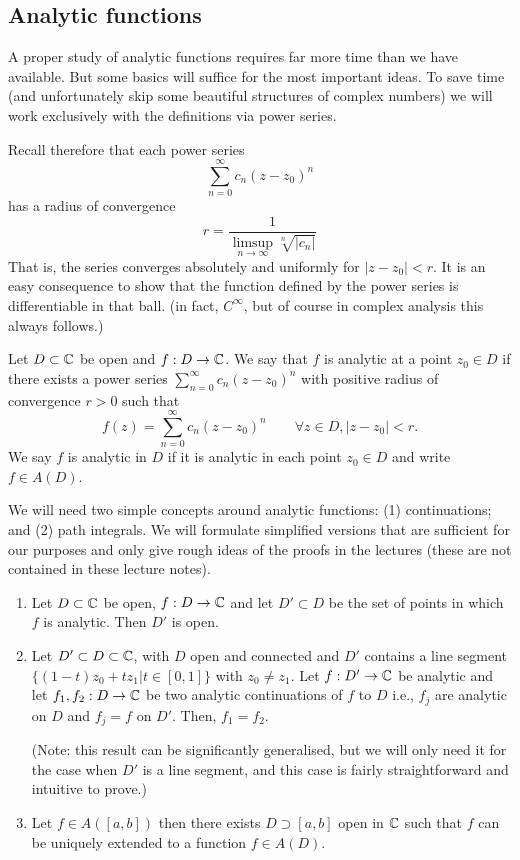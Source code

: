 

\subsection{Analytic functions}
%
A proper study of analytic functions requires far more time than we have
available. But some basics will suffice for the most important ideas.
To save time (and unfortunately skip some beautiful structures of
complex numbers) we will work exclusively with the definitions via power
series.

Recall therefore that each power series
\[
    \sum_{n = 0}^\infty c_n (z - z_0)^n
\]
has a radius of convergence
\[
    r = \frac{1}{\limsup_{n \to \infty} \sqrt[n]{|c_n|}}
\]
That is, the series converges absolutely and uniformly for $|z - z_0| < r$. It is an easy consequence to show that the function defined by the power series is differentiable in that ball. (in fact, $C^\infty$, but of course in complex analysis this always follows.)

\begin{definition}
  Let $D \subset \mathbb{C}$ be open and $f : D \to \mathbb{C}$. We say that $f$ is
  analytic at a point $z_0 \in D$ if there exists a power series
  $\sum_{n = 0}^\infty c_n (z - z_0)^n$ with  positive radius
  of convergence $r > 0$ such that
  \[
    f(z) = \sum_{n = 0}^\infty c_n (z - z_0)^n \qquad \forall
    z \in D, |z - z_0| < r.
  \]
  We say $f$ is analytic in $D$ if it is analytic in each point
  $z_0 \in D$ and write $f \in A(D)$.
\end{definition}

\medskip 

We will need two simple concepts around analytic functions: (1) continuations;
and (2) path integrals. We will formulate simplified versions that are
sufficient for our purposes and only give rough ideas of the proofs
in the lectures (these are not contained in these lecture notes).

\begin{proposition}
  \begin{enumerate} \ilist
    \item Let $D \subset \mathbb{C}$ be open, $f : D \to \mathbb{C}$ and let $D' \subset D$ be the
    set of points in which $f$ is analytic. Then $D'$ is open.
    \item Let $D' \subset D \subset \mathbb{C}$, with $D$ open and connected and $D'$
    contains a line segment $\{(1-t) z_0 + t z_1 | t \in [0,1] \}$ with $z_0
    \neq z_1$. Let $f : D' \to \mathbb{C}$ be analytic and let $f_1, f_2 : D \to \mathbb{C}$ be
    two analytic continuations of $f$ to $D$ i.e., $f_j$ are analytic on $D$ and
    $f_j = f$ on $D'$. Then, $f_1 = f_2$.

    (Note: this result can be significantly generalised, but we will only need it for the case when $D'$ is a line segment, and this case is fairly straightforward and intuitive to prove.)
    \item Let $f \in A([a, b])$ then there exists $D \supset [a,b]$ open in $\mathbb{C}$
    such that $f$ can be uniquely extended to a function $f \in A(D)$.
  \end{enumerate}
\end{proposition}

